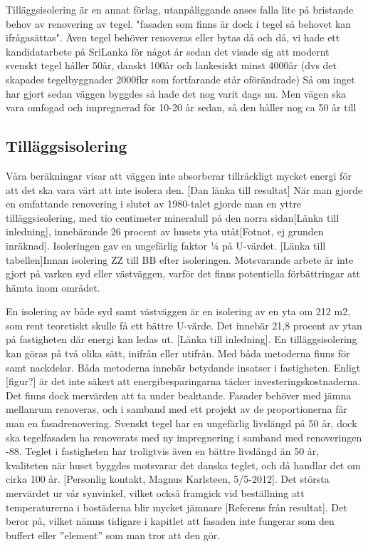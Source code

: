 Tilläggsisolering är en annat förlag, utanpåliggande anses falla lite på bristande behov av renovering av tegel. "fasaden som finns är dock i tegel så behovet kan ifrågasättas". Även tegel behöver renoveras eller bytas då och då, vi hade ett kandidatarbete på SriLanka för något år sedan det visade sig att modernt svenskt tegel håller 50år, danskt 100år och lankesiskt minst 4000år (dvs det skapades 
tegelbyggnader 2000fkr som fortfarande står oförändrade) Så om inget har gjort sedan väggen byggdes så hade det nog varit dags nu. Men vägen ska vara omfogad och impregnerad för 10-20 år sedan, så den håller nog ca 50 år till 


\subsection{Tilläggsisolering}
Våra beräkningar visar att väggen inte absorberar tillräckligt mycket energi för att det ska vara värt att inte isolera den.  [Dan länka till resultat]
När man gjorde en omfattande renovering i slutet av 1980-talet gjorde man en yttre tilläggsisolering, med tio centimeter mineralull på den norra sidan[Länka till inledning], innebärande 26 procent av husets yta utåt[Fotnot, ej grunden inräknad]. Isoleringen gav en ungefärlig faktor ¼ på U-värdet. [Länka till tabellen]Innan isolering ZZ till BB efter isoleringen. Motsvarande arbete är inte gjort på varken syd eller västväggen, varför det finns potentiella förbättringar att hämta inom området.

En isolering av både syd samt västväggen är en isolering av en yta om 212 m2, som rent teoretiskt skulle få ett bättre U-värde. Det innebär 21,8 procent av ytan på fastigheten där energi kan ledas ut. [Länka till inledning].
En tilläggsisolering kan göras på två olika sätt, inifrån eller utifrån. Med båda metoderna finns för samt nackdelar. Båda metoderna innebär betydande insatser i fastigheten. Enligt [figur?]  är det inte säkert att energibesparingarna täcker investeringskostnaderna. Det finns dock mervärden att ta under beaktande. Fasader behöver med jämna mellanrum renoveras, och i samband med ett projekt av de proportionerna får man en fasadrenovering. Svenskt tegel har en ungefärlig livslängd på 50 år, dock ska tegelfasaden ha renoverats med ny impregnering i samband med renoveringen -88. Teglet i fastigheten har troligtvis även en bättre livslängd än 50 år, kvaliteten när huset byggdes motsvarar det danska teglet, och då handlar det om cirka 100 år. [Personlig kontakt, Magnus Karlsteen, 5/5-2012]. Det största mervärdet ur vår synvinkel, vilket också framgick vid beställning att temperaturerna i bostäderna blir mycket jämnare [Referens från resultat]. Det beror på, vilket nämns tidigare i kapitlet att fasaden inte fungerar som den buffert eller ”element” som man tror att den gör.

